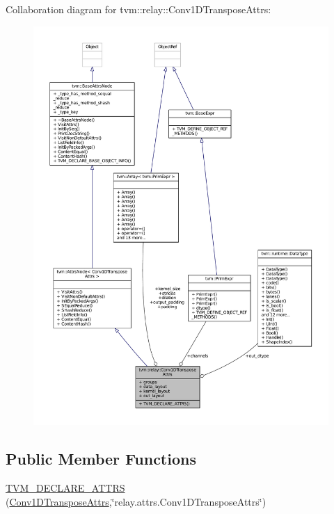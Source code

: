 Collaboration diagram for tvm\+:\+:relay\+:\+:Conv1\+D\+Transpose\+Attrs\+:
\nopagebreak
\begin{figure}[H]
\begin{center}
\leavevmode
\includegraphics[width=350pt]{structtvm_1_1relay_1_1Conv1DTransposeAttrs__coll__graph}
\end{center}
\end{figure}
\subsection*{Public Member Functions}
\begin{DoxyCompactItemize}
\item 
\hyperlink{structtvm_1_1relay_1_1Conv1DTransposeAttrs_a460522dcf1c41bd23aee4582c78c286c}{T\+V\+M\+\_\+\+D\+E\+C\+L\+A\+R\+E\+\_\+\+A\+T\+T\+RS} (\hyperlink{structtvm_1_1relay_1_1Conv1DTransposeAttrs}{Conv1\+D\+Transpose\+Attrs},\char`\"{}relay.\+attrs.\+Conv1\+D\+Transpose\+Attrs\char`\"{})
\end{DoxyCompactItemize}
